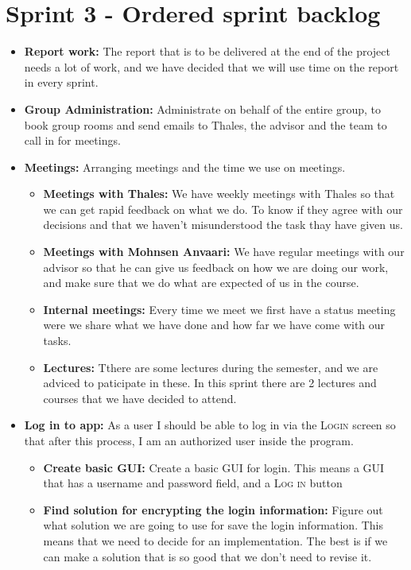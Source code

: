 

\section{Sprint 3 - Ordered sprint backlog}

\begin{itemize}
\item{}\textbf{Report work:} The report that is to be delivered at the end of the project needs a lot of work, and we have decided that we will use time on the report in every sprint.
\item{}\textbf{Group Administration:} Administrate on behalf of the entire group, to book group rooms and send emails to Thales, the advisor and the team to call in for meetings.
\item{}\textbf{Meetings:} Arranging meetings and the time we use on meetings.
\begin{itemize}
\item{}\textbf{Meetings with Thales:} We have weekly meetings with Thales so that we can get rapid feedback on what we do. To know if they agree with our decisions and that we haven't misunderstood the task thay have given us.
\item{}\textbf{Meetings with Mohnsen Anvaari:} We have regular meetings with our advisor so that he can give us feedback on how we are doing our work, and make sure that we do what are expected of us in the course.
\item{}\textbf{Internal meetings:} Every time we meet we first have a status meeting were we share what we have done and how far we have come with our tasks.
\item{}\textbf{Lectures:} Tthere are some lectures during the semester, and we are adviced to paticipate in these. In this sprint there are 2 lectures and courses that we have decided to attend.
\end{itemize}
\item{}\textbf{Log in to app:} As a user I should be able to log in via the \textsc{Login} screen so that after this process, I am an authorized user inside the program.
\begin{itemize}
\item{}\textbf{Create basic GUI:} Create a basic GUI for login. This means a GUI that has a username and password field, and a \textsc{Log in} button
\item{}\textbf{Find solution for encrypting the login information:} Figure out what solution we are going to use for save the login information. This means that we need to decide for an implementation. The best is if we can make a solution that is so good that we don’t need to revise it.

\end{itemize}
\end{itemize}
